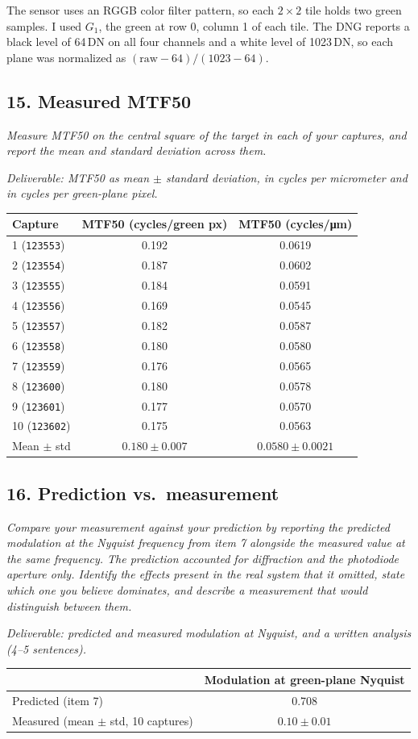 \documentclass[11pt]{article}
\newcommand{\task}[3]{\subsection*{#1}{\sloppy\noindent\textit{#2}\par}\smallskip\noindent\textit{Deliverable: #3}\par\medskip}
\begin{document}
The sensor uses an RGGB color filter pattern, so each $2 \times 2$ tile holds two green samples. I used $G_1$, the green at row 0, column 1 of each tile. The DNG reports a black level of 64\,DN on all four channels and a white level of 1023\,DN, so each plane was normalized as $(\text{raw} - 64)/(1023 - 64)$.


\task{15. Measured MTF50}
{Measure MTF50 on the central square of the target in each of your captures, and report the mean and standard deviation across them.}
{MTF50 as mean $\pm$ standard deviation, in cycles per micrometer and in cycles per green-plane pixel.}

\begin{center}
\begin{tabular}{lcc}
\toprule
Capture & MTF50 (cycles/green px) & MTF50 (cycles/\si{\micro\meter}) \\
\midrule
1 (\texttt{123553}) & 0.192 & 0.0619 \\
2 (\texttt{123554}) & 0.187 & 0.0602 \\
3 (\texttt{123555}) & 0.184 & 0.0591 \\
4 (\texttt{123556}) & 0.169 & 0.0545 \\
5 (\texttt{123557}) & 0.182 & 0.0587 \\
6 (\texttt{123558}) & 0.180 & 0.0580 \\
7 (\texttt{123559}) & 0.176 & 0.0565 \\
8 (\texttt{123600}) & 0.180 & 0.0578 \\
9 (\texttt{123601}) & 0.177 & 0.0570 \\
10 (\texttt{123602}) & 0.175 & 0.0563 \\
\midrule
Mean $\pm$ std & $0.180 \pm 0.007$ & $0.0580 \pm 0.0021$ \\
\bottomrule
\end{tabular}
\end{center}

\task{16. Prediction vs.\ measurement}
{Compare your measurement against your prediction by reporting the predicted modulation at the Nyquist frequency from item 7 alongside the measured value at the same frequency. The prediction accounted for diffraction and the photodiode aperture only. Identify the effects present in the real system that it omitted, state which one you believe dominates, and describe a measurement that would distinguish between them.}
{predicted and measured modulation at Nyquist, and a written analysis (4--5 sentences).}

\begin{center}
\begin{tabular}{lc}
\toprule
 & Modulation at green-plane Nyquist \\
\midrule
Predicted (item 7) & 0.708 \\
Measured (mean $\pm$ std, 10 captures) & $0.10 \pm 0.01$ \\
\bottomrule
\end{tabular}
\end{center}
\end{document}

